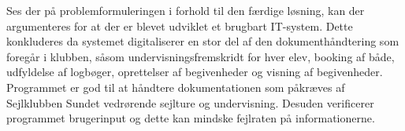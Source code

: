 Ses der på problemformuleringen i forhold til den færdige løsning, kan der argumenteres for at der er blevet udviklet et brugbart IT-system. 
Dette konkluderes da systemet digitaliserer en stor del af den dokumenthåndtering som foregår i klubben, såsom undervisningsfremskridt for hver elev, booking af både, udfyldelse af logbøger, oprettelser af begivenheder og visning af begivenheder.
Programmet er god til at håndtere dokumentationen som påkræves af Sejlklubben Sundet vedrørende sejlture og undervisning.
Desuden verificerer programmet brugerinput og dette kan mindske fejlraten på informationerne.


